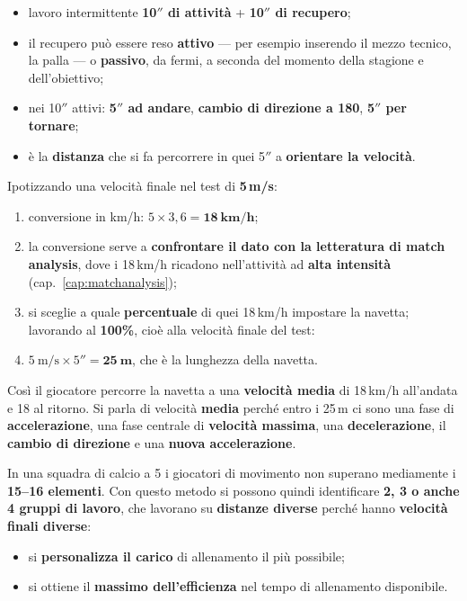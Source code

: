 \begin{itemize}
  \item lavoro intermittente \textbf{10$''$ di attività} + \textbf{10$''$ di recupero};
  \item il recupero può essere reso \textbf{attivo} --- per esempio inserendo il mezzo tecnico, la
    palla --- o \textbf{passivo}, da fermi, a seconda del momento della stagione e dell'obiettivo;
  \item nei 10$''$ attivi: \textbf{5$''$ ad andare}, \textbf{cambio di direzione a
    180\textdegree}, \textbf{5$''$ per tornare};
  \item è la \textbf{distanza} che si fa percorrere in quei 5$''$ a \textbf{orientare la velocità}.
\end{itemize}

Ipotizzando una velocità finale nel test di \textbf{5\,m/s}:

\begin{enumerate}
  \item conversione in km/h: $5 \times 3,6 = \mathbf{18\ km/h}$;
  \item la conversione serve a \textbf{confrontare il dato con la letteratura di match analysis},
    dove i 18\,km/h ricadono nell'attività ad \textbf{alta intensità}
    (cap.~\ref{cap:matchanalysis});
  \item si sceglie a quale \textbf{percentuale} di quei 18\,km/h impostare la navetta; lavorando al
    \textbf{100\%}, cioè alla velocità finale del test:
  \item $5\ \text{m/s} \times 5'' = \mathbf{25\ m}$, che è la lunghezza della navetta.
\end{enumerate}

Così il giocatore percorre la navetta a una \textbf{velocità media} di 18\,km/h all'andata e 18 al
ritorno. Si parla di velocità \textbf{media} perché entro i 25\,m ci sono una fase di
\textbf{accelerazione}, una fase centrale di \textbf{velocità massima}, una \textbf{decelerazione},
il \textbf{cambio di direzione} e una \textbf{nuova accelerazione}.

In una squadra di calcio a 5 i giocatori di movimento non superano mediamente i \textbf{15--16
elementi}. Con questo metodo si possono quindi identificare \textbf{2, 3 o anche 4 gruppi di
lavoro}, che lavorano su \textbf{distanze diverse} perché hanno \textbf{velocità finali diverse}:

\begin{itemize}
  \item si \textbf{personalizza il carico} di allenamento il più possibile;
  \item si ottiene il \textbf{massimo dell'efficienza} nel tempo di allenamento disponibile.
\end{itemize}

